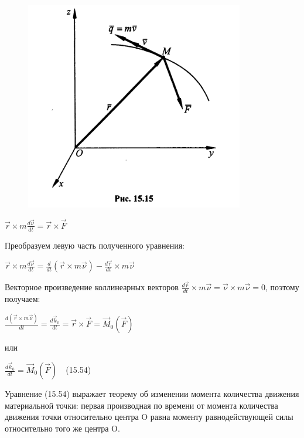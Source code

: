 {\begin{center}
    \par \begin{figure}[H]
    \centering \includegraphics[scale = 0.5]{img/15.15.jpeg}
    \end{figure}
    
    \par $\vec{r}\times m\frac{d\vec{\nu}}{dt}=\vec{r}\times \vec{F}$
    
    \par Преобразуем левую часть полученного уравнения:
    
    \par $\vec{r}\times m\frac{d\vec{\nu}}{dt}=\frac{d}{dt}(\vec{r}\times m\vec{\nu})-\frac{d\vec{r}}{dt}\times m\vec{\nu}$
    
    \par Векторное произведение коллинеарных векторов $\frac{d\vec{r}}{dt}\times m\vec{\nu}=\vec{\nu}\times m\vec{\nu}=0$, поэтому получаем:
    
    \par $\frac{d(\vec{r}\times m\vec{\nu})}{dt}=\frac{d\vec{k}_0}{dt}=\vec{r}\times \vec{F}=\vec{M}_0(\vec{F})$
    
    \par или 
    
    \par $\frac{d\vec{k}_0}{dt}=\vec{M}_0(\vec{F})\quad$(15.54)
    
    \par Уравнение  (15.54)  выражает  теорему об  изменении  момента  количества  движения материальной точки: первая производная по времени от момента количества движения  точки  относительно  центра  O равна  моменту  равнодействующей  силы относительно того же центра O.
    

\end{center}}
